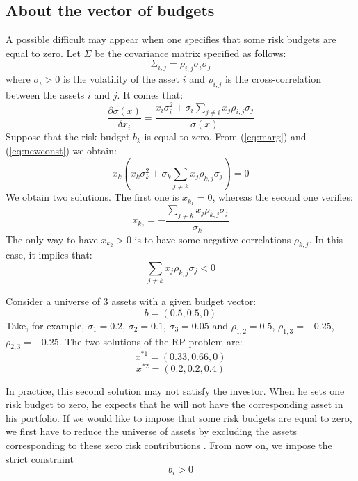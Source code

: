 \subsection{About the vector of budgets}
A possible difficult may appear when one specifies that some risk budgets are equal to zero. Let $\Sigma$ be the covariance matrix specified as follows:
\begin{equation}
\Sigma_{i,j} = \rho_{i,j}\sigma_i \sigma_j
\end{equation}
where $\sigma_i > 0$ is the volatility of the asset $i$ and $\rho_{i,j}$ is the cross-correlation between the assets $i$ and $j$. It comes that:
\begin{equation}
\frac{\partial \sigma(x)}{\delta x_i} = \frac{x_i \sigma_i^2 + \sigma_i \sum_{j \neq i} x_j \rho_{i,j} \sigma_j}{\sigma(x)}
\end{equation}
Suppose that the risk budget $b_k$ is equal to zero. From (\ref{eq:marg}) and (\ref{eq:newconst}) we obtain:
\begin{equation}
x_k\left( x_k \sigma_k^2 + \sigma_k \sum_{j \neq k} x_j \rho_{k,j} \sigma_j\right) = 0
\end{equation}
We obtain two solutions. The first one is $x_{k_1} = 0$, whereas the second one verifies:
\begin{equation}
x_{k_2} = - \frac{\sum_{j \neq k}x_j \rho_{k,j} \sigma_j}{\sigma_k}
\end{equation}
The only way to have $x_{k_2} > 0$ is to have some negative correlations $\rho_{k,j}$. In this case, it implies that:
\begin{equation}
\sum_{j \neq k}x_j \rho_{k,j} \sigma_j <0
\end{equation}
\begin{example}
Consider a universe of 3 assets with a given budget vector:
\begin{equation*}
b=(0.5,0.5, 0)
\end{equation*}
Take, for example, $\sigma_1 = 0.2$, $\sigma_2 = 0.1$, $\sigma_3 = 0.05$ and $\rho_{1,2} = 0.5$, $\rho_{1,3} = -0.25$, $\rho_{2,3} = -0.25$. The two solutions of the RP problem are:
\begin{equation*}
x^{*1} = (0.33, 0.66, 0)
\end{equation*}
\begin{equation*}
x^{*2} = (0.2, 0.2, 0.4)
\end{equation*}
\end{example}
In practice, this second solution may not satisfy the investor. When he sets one risk budget to zero, he expects that he will not have the corresponding asset in his portfolio. If we would like to impose that some risk budgets are equal to zero, we first have to reduce the universe of assets by excluding the assets corresponding to these zero risk contributions \cite{intr}. From now on, we impose the strict constraint
\begin{equation}
b_i >0
\end{equation}

